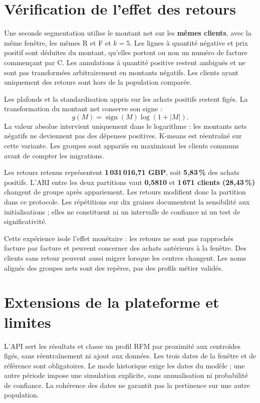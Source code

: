 \documentclass[11pt,a4paper]{article}
\begin{document}
\newpage
\section{Vérification de l'effet des retours}
Une seconde segmentation utilise le montant net sur les \textbf{mêmes clients},
avec la même fenêtre, les mêmes R et F et $k=5$. Les lignes à quantité négative
et prix positif sont déduites du montant, qu'elles portent ou non un numéro
de facture commençant par C. Les annulations à quantité positive restent
ambiguës et ne sont pas transformées arbitrairement en montants négatifs.
Les clients ayant uniquement des retours sont hors de la population comparée.

Les plafonds et la standardisation appris sur les achats positifs restent
figés. La transformation du montant net conserve son signe :
\[
 g(M)=\operatorname{sign}(M)\log(1+|M|).
\]
La valeur absolue intervient uniquement dans le logarithme : les montants
nets négatifs ne deviennent pas des dépenses positives. K-means est
réentraîné sur cette variante. Les groupes sont appariés en maximisant les
clients communs avant de compter les migrations.

Les retours retenus représentent \textbf{1\,031\,016,71 GBP}, soit
\textbf{5,83\,\%} des achats positifs. L'ARI entre les deux partitions vaut
\textbf{0,5810} et \textbf{1\,671 clients (28,43\,\%)} changent de groupe
après appariement. Les retours modifient donc la partition dans ce protocole.
Les répétitions sur dix graines documentent la sensibilité aux initialisations ;
elles ne constituent ni un intervalle de confiance ni un test de significativité.

Cette expérience isole l'effet monétaire : les retours ne sont pas rapprochés
facture par facture et peuvent concerner des achats antérieurs à la fenêtre.
Des clients sans retour peuvent aussi migrer lorsque les centres changent.
Les noms alignés des groupes nets sont des repères, pas des profils métier validés.

\section{Extensions de la plateforme et limites}
L'API sert les résultats et classe un profil RFM par proximité aux centroïdes
figés, sans réentraînement ni ajout aux données. Les trois dates de la fenêtre
et de référence sont obligatoires. Le mode historique exige les dates du
modèle ; une autre période impose une simulation explicite, sans annualisation
ni probabilité de confiance. La cohérence des dates ne garantit pas la
pertinence sur une autre population.
\end{document}
